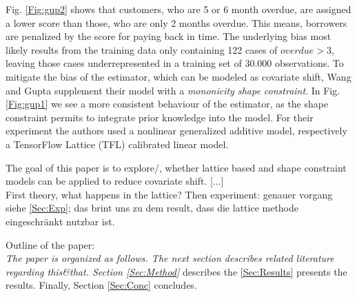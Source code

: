 Fig. \ref{Fig:gup2} shows that customers, who are 5 or 6 month overdue, are assigned a lower score than those, who are only 2 months overdue. This means, borrowers are penalized by the score for paying back in time. The underlying bias most likely results from the training data only containing 122 cases of $overdue > 3$, leaving those cases underrepresented in a training set of 30.000 observations. To mitigate the bias of the estimator, which can be modeled as covariate shift, Wang and Gupta supplement their model with a \textit{mononicity shape constraint}. In Fig. \ref{Fig:gup1} we see a more consistent behaviour of the estimator, as the shape constraint permits to integrate prior knowledge into the model. For their experiment the authors used a nonlinear generalized additive model, respectively a TensorFlow Lattice (TFL) calibrated linear model. 

The goal of this paper is to explore/, whether lattice based and shape constraint models can be applied to reduce covariate shift. [...] \\
First theory, what happens in the lattice? Then experiment: genauer vorgang siehe \ref{Sec:Exp}; das brint uns zu dem result, dass die lattice methode eingeschränkt nutzbar ist.

Outline of the paper:\\
	{\it The paper is organized as follows. The next section describes related literature regarding this\&that. Section \ref{Sec:Method}} describes the  \ref{Sec:Results} presents the results. Finally, Section
		\ref{Sec:Conc} concludes.

%	
%	
%	
%	
%	
%	
%	
%	
